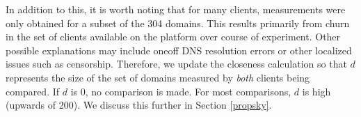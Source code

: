 In addition to this, it is worth noting that for many clients, measurements were only obtained for
a subset of the 304 domains. This results primarily from churn in the set of clients available on
the platform over course of experiment. Other possible explanations may include oneoff DNS
resolution errors or other localized issues such as censorship. Therefore, we update the closeness
calculation so that $d$ represents the size of the set of domains measured by \emph{both} clients
being compared. If $d$ is 0, no comparison is made. For most comparisons, $d$ is high (upwards of
200). We discuss this further in Section \ref{propsky}.


